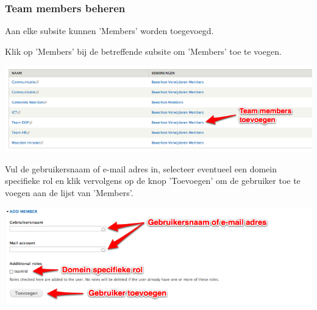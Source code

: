 \subsubsection{Team members beheren}\label{teammembersbeheren}
Aan elke subsite kunnen 'Members' worden toegevoegd.

\bigskip

Klik op 'Members' bij de betreffende subsite om 'Members' toe te voegen.

\begin{center}
	\includegraphics[width=\textwidth]{img/dominion3.png}
\end{center}

\bigskip

Vul de gebruikersnaam of e-mail adres in, selecteer eventueel een domein specifieke rol en klik vervolgens op de knop 'Toevoegen' om de gebruiker toe te voegen aan de lijst van 'Members'.

\bigskip

\begin{center}
	\includegraphics[width=\textwidth]{img/dominion4.png}
\end{center}
